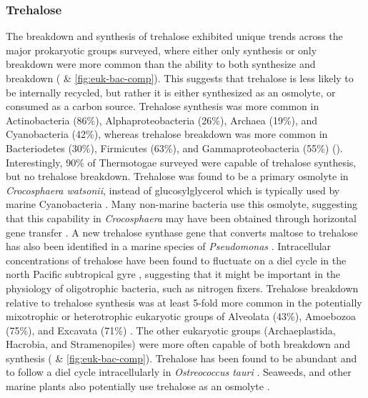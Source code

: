 \documentclass[utf8]{frontiersSCNS} %
\begin{document}
\subsubsection*{Trehalose}
The breakdown and synthesis of trehalose exhibited unique trends across the major prokaryotic groups surveyed, where either only synthesis or only breakdown were more common than the ability to both synthesize and breakdown ( \& \ref{fig:euk-bac-comp}). This suggests that trehalose is less likely to be internally recycled, but rather it is either synthesized as an osmolyte, or consumed as a carbon source. Trehalose synthesis was more common in Actinobacteria (86\%), Alphaproteobacteria (26\%), Archaea (19\%), and Cyanobacteria (42\%), whereas trehalose breakdown was more common in Bacteriodetes (30\%), Firmicutes (63\%), and Gammaproteobacteria (55\%) (). Interestingly, 90\% of Thermotogae surveyed were capable of trehalose synthesis, but no trehalose breakdown. Trehalose was found to be a primary osmolyte in \emph{Crocosphaera watsonii}, instead of glucosylglycerol which is typically used by marine Cyanobacteria \citep{Pade2012}. Many non-marine bacteria use this osmolyte, suggesting that this capability in \emph{Crocosphaera} may have been obtained through horizontal gene transfer \citep{Pade2012}. A new trehalose synthase gene that converts maltose to trehalose has also been identified in a marine species of \emph{Pseudomonas} \citep{Gao2013}. Intracellular concentrations of trehalose have been found to fluctuate on a diel cycle in the north Pacific subtropical gyre \citep{Boysen2020}, suggesting that it might be important in the physiology of oligotrophic bacteria, such as nitrogen fixers. Trehalose breakdown relative to trehalose synthesis was at least 5-fold more common in the potentially mixotrophic or heterotrophic eukaryotic groups of Alveolata (43\%), Amoebozoa (75\%), and Excavata (71\%) . The other eukaryotic groups (Archaeplastida, Hacrobia, and Stramenopiles) were more often capable of both breakdown and synthesis ( \& \ref{fig:euk-bac-comp}). Trehalose has been found to be abundant and to follow a diel cycle intracellularly in \emph{Ostreococcus tauri} \citep{Hirth2017}. Seaweeds, and other marine plants also potentially use trehalose as an osmolyte \citep{Xuan2012,Danaraj2020}.
\end{document}
